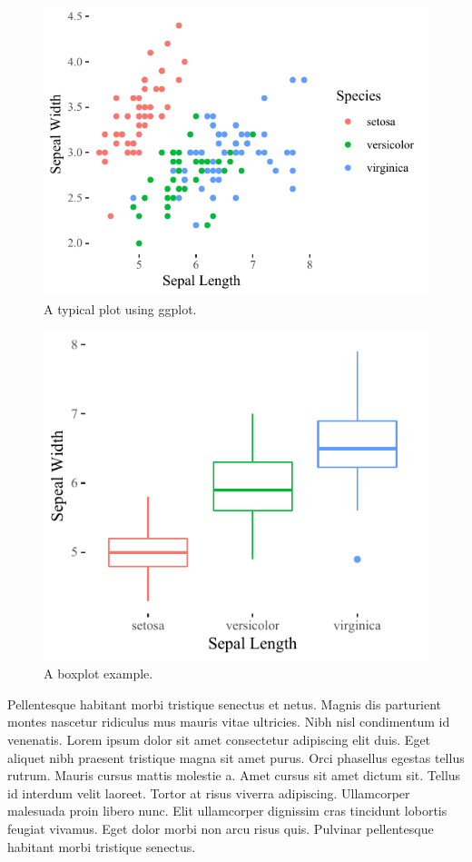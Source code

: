 \documentclass[article,30pt,extrafontsizes]{memoir}
\begin{document}
\begin{adjmulticols*}{3}{10mm}{10mm}
{\begin{figure}

{\centering \includegraphics[width=0.6\linewidth]{skeleton_files/figure-latex/unnamed-chunk-4-1} 

}

\caption{A typical plot using ggplot.}\label{fig:unnamed-chunk-4}
\end{figure}

\begin{figure}

{\centering \includegraphics[width=0.5\linewidth]{skeleton_files/figure-latex/unnamed-chunk-5-1} 

}

\caption{A boxplot example.}\label{fig:unnamed-chunk-5}
\end{figure}

Pellentesque habitant morbi tristique senectus et netus. Magnis dis
parturient montes nascetur ridiculus mus mauris vitae ultricies. Nibh
nisl condimentum id venenatis. Lorem ipsum dolor sit amet consectetur
adipiscing elit duis. Eget aliquet nibh praesent tristique magna sit
amet purus. Orci phasellus egestas tellus rutrum. Mauris cursus mattis
molestie a. Amet cursus sit amet dictum sit. Tellus id interdum velit
laoreet. Tortor at risus viverra adipiscing. Ullamcorper malesuada proin
libero nunc. Elit ullamcorper dignissim cras tincidunt lobortis feugiat
vivamus. Eget dolor morbi non arcu risus quis. Pulvinar pellentesque
habitant morbi tristique senectus.

}
\end{adjmulticols*}
\end{document}
